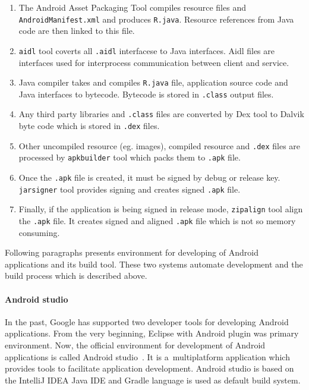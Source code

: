 \begin{enumerate}
    \item The Android Asset Packaging Tool compiles resource files and \texttt{AndroidManifest.xml} and produces
    \texttt{R.java}. Resource references from Java code are then linked to this file.
    \item \texttt{aidl} tool coverts all \texttt{.aidl} interfacese to Java interfaces. Aidl files are interfaces used
    for interprocess communication between client and service.
    \item Java compiler takes and compiles \texttt{R.java} file, application source code and Java interfaces to
    bytecode. Bytecode is stored in \texttt{.class} output files.
    \item Any third party libraries and \texttt{.class} files are converted by Dex tool to Dalvik byte code which is
    stored in \texttt{.dex} files.
    \item Other uncompiled resource (eg. images), compiled resource and \texttt{.dex} files are processed by
    \texttt{apkbuilder} tool which packs them to \texttt{.apk} file.
    \item Once the \texttt{.apk} file is created, it must be signed by debug or release key. \texttt{jarsigner} tool
    provides signing and creates signed \texttt{.apk} file.
    \item Finally, if the application is being signed in release mode, \texttt{zipalign} tool align the \texttt{.apk}
    file. It creates signed and aligned \texttt{.apk} file which is not so memory consuming.
\end{enumerate}

Following paragraphs presents environment for developing of Android applications and its build tool. These two systems
automate development and the build process which is described above.

\paragraph{Android studio}
In the past, Google has supported two developer tools for developing Android applications. From the very beginning,
Eclipse with Android plugin was primary environment. Now, the official environment for development of Android
applications is called Android studio~\cite{AndroidDev}. It is a~multiplatform application which provides tools to
facilitate application development. Android studio is based on the IntelliJ IDEA Java IDE and Gradle language is used as
default build system.

